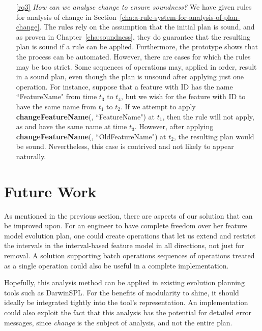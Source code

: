\begin{enumerate}
   \item[\ref{rq3}] \textit{How can we analyse change to ensure soundness?} 
      We have given rules for analysis of change in Section~\vref{cha:a-rule-system-for-analysis-of-plan-change}. The rules rely on the assumption that the initial plan is sound, and as proven in Chapter~\vref{cha:soundness}, they do guarantee that the resulting plan is sound if a rule can be applied. Furthermore, the prototype  shows that the process can be automated. However, there are cases for which the rules may be too strict. Some sequences of operations may, applied in order, result in a sound plan, even though the plan is unsound after applying just one operation. For instance, suppose that a feature with ID  has the name ``FeatureName" from time $t_3$ to $t_4$, but we wish for the feature with ID  to have the same name from $t_1$ to $t_2$. If we attempt to apply \textbf{changeFeatureName}(, ``FeatureName") at $t_1$, then the  rule will not apply, as  and  have the same name at time $t_3$. However, after applying \textbf{changeFeatureName}(, ``OldFeatureName") at $t_2$, the resulting plan would be sound.
      Nevertheless, this case is contrived and not likely to appear naturally. 
      
\end{enumerate}

\section{Future Work}

As mentioned in the previous section, there are aspects of our solution that can be improved upon. For an engineer to have complete freedom over her feature model evolution plan, one could create operations that let us extend and restrict the intervals in the interval-based feature model in all directions, not just for removal. A solution supporting batch operations \textemdash{} sequences of operations treated as a single operation \textemdash{} could also be useful in a complete implementation. 

Hopefully, this analysis method can be applied in existing evolution planning tools such as DarwinSPL. For the benefits of modularity to shine, it should ideally be integrated tightly into the tool's representation. An implementation could also exploit the fact that this analysis has the potential for detailed error messages, since \emph{change} is the subject of analysis, and not the entire plan.


